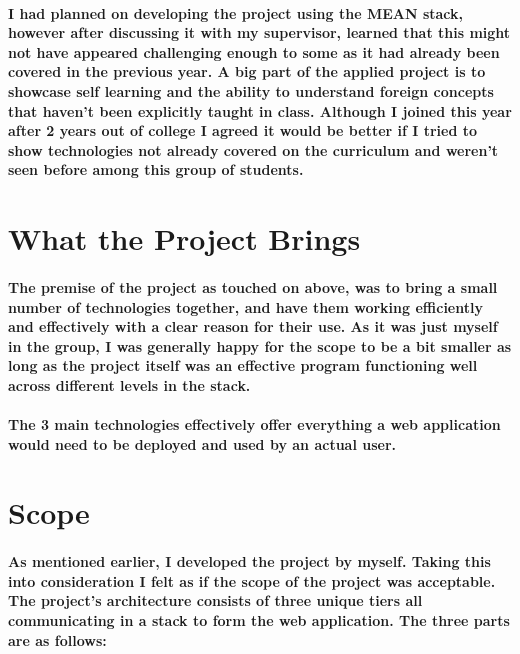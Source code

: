 \paragraph{I had planned on developing the project using the MEAN stack, however after discussing it with my supervisor, learned that this might not have appeared challenging enough to some as it had already been covered in the previous year. A big part of the applied project is to showcase self learning and the ability to understand foreign concepts that haven't been explicitly taught in class. Although I joined this year after 2 years out of college I agreed it would be better if I tried to show technologies not already covered on the curriculum and weren't seen before among this group of students.}

\section{What the Project Brings}
\paragraph{The premise of the project as touched on above, was to bring a small number of technologies together, and have them working efficiently and effectively with a clear reason for their use. As it was just myself in the group, I was generally happy for the scope to be a bit smaller as long as the project itself was an effective program functioning well across different levels in the stack.}
\paragraph{The 3 main technologies effectively offer everything a web application would need to be deployed and used by an actual user.  }

\section{Scope}
\paragraph{As mentioned earlier, I developed the project by myself. Taking this into consideration I felt as if the scope of the project was acceptable. The project's architecture consists of three unique tiers all communicating in a stack to form the web application. The three parts are as follows: }

